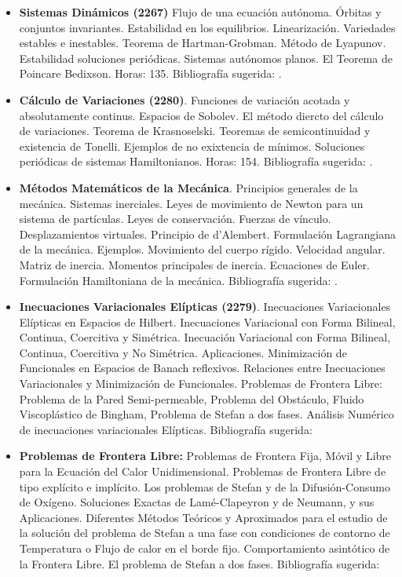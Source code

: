 \documentclass[a4paper, 12pt]{article}
\begin{document}
\begin{enumerate}
\begin{itemize}
 
\item \textbf{Sistemas Dinámicos (2267)}  Flujo de una ecuación autónoma. Órbitas y conjuntos invariantes. Estabilidad en los equilibrios.   Linearización. Variedades estables e inestables. Teorema de Hartman-Grobman. Método de
Lyapunov. Estabilidad soluciones periódicas. Sistemas autónomos planos. El Teorema de Poincare Bedixson. Horas: 135. Bibliografía  sugerida: \cite{betounes2009differential,teschl2012ordinary}.

\item\textbf{ Cálculo de Variaciones (2280)}. Funciones de variación acotada y absolutamente continus. Espacios de Sobolev. El método diercto del cálculo de variaciones. Teorema de Krasnoselski. Teoremas de semicontinuidad y existencia de Tonelli. Ejemplos de no exixtencia de mínimos. Soluciones periódicas de sistemas Hamiltonianos. Horas: 154. Bibliografía  sugerida: \cite{mawhin2013critical,buttazzo1998one}.


\item\textbf{ Métodos Matemáticos de la Mecánica}. Principios generales de la mecánica. Sistemas inerciales. Leyes de movimiento de Newton para un  sistema de partículas. Leyes de conservación. Fuerzas de vínculo. Desplazamientos virtuales.  Principio de d'{}Alembert. Formulación Lagrangiana de la mecánica. Ejemplos. Movimiento del cuerpo rígido. Velocidad angular. Matriz de inercia. Momentos principales de inercia. Ecuaciones de Euler. Formulación Hamiltoniana de la mecánica. 
Bibliografía  sugerida: \cite{Arnold,arnold2006mathematical}.


\item\textbf{Inecuaciones Variacionales Elípticas (2279)}. Inecuaciones
Variacionales E\-lípticas en Espacios de Hilbert. Inecuaciones
Variacional con Forma Bilineal, Continua, Coercitiva y Simétrica.
Inecuación Variacional con Forma Bilineal, Continua, Coercitiva y
No Simétrica. Aplicaciones. Minimización de Funcionales en
Espacios de Banach reflexivos. Relaciones entre Inecuaciones
Variacionales y Minimización de Funciona\-les. Problemas de
Frontera Libre: Problema de la Pared Semi-permea\-ble, Problema
del Obstáculo, Fluido Viscoplástico de Bingham, Problema de Stefan
a dos fases. Análisis Numérico de inecuaciones variacionales
Elípticas. Bibliografía sugerida: \cite{ekel, kinder}


 


\item\textbf{Problemas de Frontera Libre:} Problemas de Frontera Fija, Móvil
y Libre para la Ecuación del Calor Unidimensional. Problemas de
Frontera Libre de tipo explícito e implícito. Los problemas de
Stefan y de la Difusión-Consumo de Oxígeno. Soluciones Exactas de
Lamé-Clapeyron y de Neumann, y sus Aplicaciones. Diferentes
Métodos Teóricos y Aproximados para el estudio de la solución del
problema de Stefan a una fase con condiciones de contorno de
Temperatura o Flujo de calor en el borde fijo. Comportamiento
asintótico de la Frontera Libre. El problema de Stefan a dos
fases. Bibliografía  sugerida: \cite{hill,tarzia}





\end{itemize}
\end{enumerate}
\end{document}
